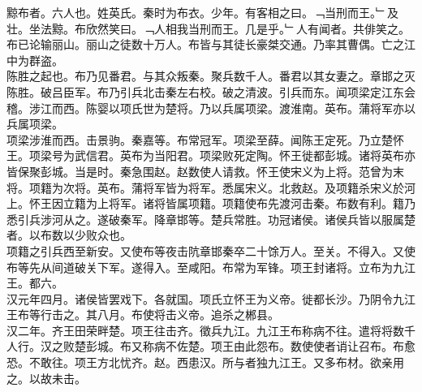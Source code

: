 \documentclass{zhvt-classic}
\begin{document}

\hspace*{2em}黥布者。六人也。姓英氏。秦时为布衣。少年。有客相之曰。﹁当刑而王。﹂及壮。坐法黥。布欣然笑曰。﹁人相我当刑而王。几是乎。﹂人有闻者。共俳笑之。布已论输丽山。丽山之徒数十万人。布皆与其徒长豪桀交通。乃率其曹偶。亡之江中为群盗。\\
\hspace*{2em}陈胜之起也。布乃见番君。与其众叛秦。聚兵数千人。番君以其女妻之。章邯之灭陈胜。破吕臣军。布乃引兵北击秦左右校。破之清波。引兵而东。闻项梁定江东会稽。涉江而西。陈婴以项氏世为楚将。乃以兵属项梁。渡淮南。英布。蒲将军亦以兵属项梁。\\
\hspace*{2em}项梁涉淮而西。击景驹。秦嘉等。布常冠军。项梁至薛。闻陈王定死。乃立楚怀王。项梁号为武信君。英布为当阳君。项梁败死定陶。怀王徙都彭城。诸将英布亦皆保聚彭城。当是时。秦急围赵。赵数使人请救。怀王使宋义为上将。范曾为末将。项籍为次将。英布。蒲将军皆为将军。悉属宋义。北救赵。及项籍杀宋义於河上。怀王因立籍为上将军。诸将皆属项籍。项籍使布先渡河击秦。布数有利。籍乃悉引兵涉河从之。遂破秦军。降章邯等。楚兵常胜。功冠诸侯。诸侯兵皆以服属楚者。以布数以少败众也。\\
\hspace*{2em}项籍之引兵西至新安。又使布等夜击阬章邯秦卒二十馀万人。至关。不得入。又使布等先从间道破关下军。遂得入。至咸阳。布常为军锋。项王封诸将。立布为九江王。都六。\\
\hspace*{2em}汉元年四月。诸侯皆罢戏下。各就国。项氏立怀王为义帝。徙都长沙。乃阴令九江王布等行击之。其八月。布使将击义帝。追杀之郴县。\\
\hspace*{2em}汉二年。齐王田荣畔楚。项王往击齐。徵兵九江。九江王布称病不往。遣将将数千人行。汉之败楚彭城。布又称病不佐楚。项王由此怨布。数使使者诮让召布。布愈恐。不敢往。项王方北忧齐。赵。西患汉。所与者独九江王。又多布材。欲亲用之。以故未击。\\
\end{document}
